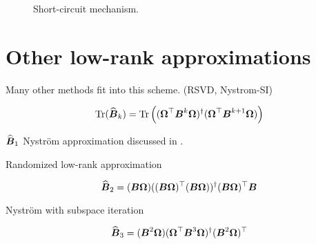 \begin{figure}[ht]
    \centering
    
    \caption{Short-circuit mechanism.}
    \label{fig:3-nystrom-short-circuit-mechanism}
\end{figure}


\section{Other low-rank approximations}
\label{sec:3-nystrom-other-low-rank}

Many other methods fit into this scheme. (RSVD, Nystrom-SI)


\begin{equation}
    \operatorname{Tr}(\widehat{\boldsymbol{B}}_k)
        = \operatorname{Tr}\left((\boldsymbol{\Omega}^{\top} \boldsymbol{B}^k \boldsymbol{\Omega})^{\dagger} (\boldsymbol{\Omega}^{\top} \boldsymbol{B}^{k+1} \boldsymbol{\Omega}) \right)
    \label{equ:3-nystrom-}
\end{equation}

$\widehat{\boldsymbol{B}}_1$ Nystr\"om approximation discussed in .

Randomized low-rank approximation \cite{halko2011finding, tropp2023randomized}

\begin{equation}
    \widehat{\boldsymbol{B}}_2 = (\boldsymbol{B} \boldsymbol{\Omega}) ((\boldsymbol{B} \boldsymbol{\Omega})^{\top} (\boldsymbol{B} \boldsymbol{\Omega}))^{\dagger} (\boldsymbol{B} \boldsymbol{\Omega})^{\top} \boldsymbol{B}
    \label{equ:3-nystrom-RSVD}
\end{equation}

Nystr\"om with subspace iteration \cite{tropp2023randomized}

\begin{equation}
    \widehat{\boldsymbol{B}}_3 = (\boldsymbol{B}^2 \boldsymbol{\Omega}) (\boldsymbol{\Omega}^{\top} \boldsymbol{B}^3 \boldsymbol{\Omega})^{\dagger} (\boldsymbol{B}^2 \boldsymbol{\Omega})^{\top}
    \label{equ:3-nystrom-nystrom-SI}
\end{equation}

